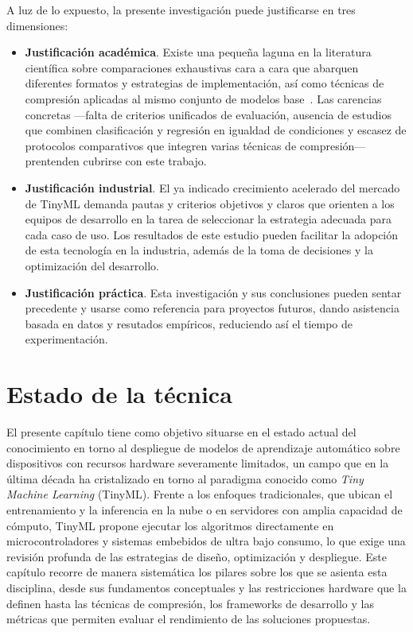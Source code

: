\documentclass[a4paper,12pt,twoside,final]{book}
\begin{document}
A luz de lo expuesto, la presente investigación puede justificarse en tres dimensiones:
\begin{itemize}
  \item \textbf{Justificación académica}. Existe una pequeña laguna en la literatura científica sobre comparaciones
  exhaustivas cara a cara que abarquen diferentes formatos y estrategias de implementación, así como técnicas
  de compresión aplicadas al mismo conjunto de modelos base~\cite{hong2024etri}. Las carencias concretas ---falta
  de criterios unificados de evaluación, ausencia de estudios que combinen clasificación y regresión en igualdad
  de condiciones y escasez de protocolos comparativos que integren varias técnicas de compresión--- prentenden
  cubrirse con este trabajo.
  \item \textbf{Justificación industrial}. El ya indicado crecimiento acelerado del mercado de TinyML demanda
  pautas y criterios objetivos y claros que orienten a los equipos de desarrollo en la tarea de seleccionar
  la estrategia adecuada para cada caso de uso. Los resultados de este estudio pueden facilitar la adopción
  de esta tecnología en la industria, además de la toma de decisiones y la optimización del desarrollo.
  \item \textbf{Justificación práctica}. Esta investigación y sus conclusiones pueden sentar precedente y usarse como
  referencia para proyectos futuros, dando asistencia basada en datos y resutados empíricos, reduciendo así
  el tiempo de experimentación.
\end{itemize}


\chapter{Estado de la técnica}\label{chap:estado_tecnica}
El presente capítulo tiene como objetivo situarse en el estado actual del conocimiento en torno al despliegue de
modelos de aprendizaje automático sobre dispositivos con recursos hardware severamente limitados, un campo que en la
última década ha cristalizado en torno al paradigma conocido como \textit{Tiny Machine Learning} (TinyML). Frente a
los enfoques tradicionales, que ubican el entrenamiento y la inferencia en la nube o en servidores con amplia
capacidad de cómputo, TinyML propone ejecutar los algoritmos directamente en microcontroladores y sistemas embebidos
de ultra bajo consumo, lo que exige una revisión profunda de las estrategias de diseño, optimización y despliegue.
Este capítulo recorre de manera sistemática los pilares sobre los que se asienta esta disciplina, desde sus
fundamentos conceptuales y las restricciones hardware que la definen hasta las técnicas de compresión, los frameworks
de desarrollo y las métricas que permiten evaluar el rendimiento de las soluciones propuestas.
\end{document}
